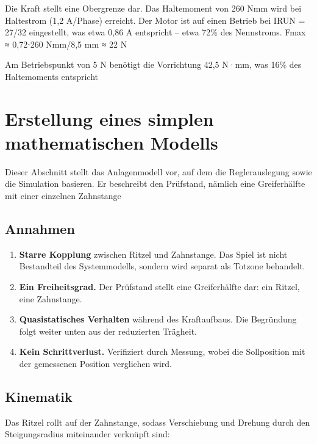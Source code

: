 Die Kraft stellt eine Obergrenze dar.
Das Haltemoment von 260 Nmm wird bei Haltestrom (1,2 A/Phase) erreicht. Der Motor ist auf einen Betrieb bei IRUN = 27/32 eingestellt, was etwa 0,86 A entspricht – etwa 72\% des Nennstroms.
Fmax ≈ 0,72⋅260 Nmm/8,5 mm ≈ 22 N

Am Betriebspunkt von 5 N benötigt die Vorrichtung 42,5 N·mm, was 16\% des Haltemoments entspricht

\section{Erstellung eines simplen mathematischen Modells}

Dieser Abschnitt stellt das Anlagenmodell vor, auf dem die Reglerauslegung 
sowie die Simulation basieren. Er beschreibt den Prüfstand,
nämlich eine Greiferhälfte mit einer einzelnen Zahnstange

\subsection*{Annahmen}

\begin{enumerate}
    \item \textbf{Starre Kopplung} zwischen Ritzel und Zahnstange. Das Spiel ist nicht Bestandteil
          des Systemmodells, sondern wird separat als Totzone behandelt.
    \item \textbf{Ein Freiheitsgrad.} Der Prüfstand stellt eine Greiferhälfte dar:
          ein Ritzel, eine Zahnstange.
    \item \textbf{Quasistatisches Verhalten} während des Kraftaufbaus. Die
          Begründung folgt weiter unten aus der reduzierten Trägheit.
    \item \textbf{Kein Schrittverlust.} Verifiziert durch Messung, wobei die
          Sollposition mit der gemessenen Position verglichen wird.
\end{enumerate}

\subsection*{Kinematik}

Das Ritzel rollt auf der Zahnstange, sodass Verschiebung und Drehung durch den
Steigungsradius miteinander verknüpft sind:


